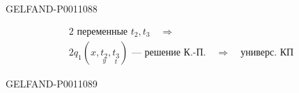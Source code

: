 \begin{GelfandAdjacentEvidence}{GELFAND-P001108}{8}


\[
\begin{gathered}
2\text{ переменные }t_2,t_3\quad\Rightarrow\\
2q_1(x,\underset{y}{t_2},\underset{t}{t_3})
\text{ — решение К.-П.}\quad\Rightarrow\quad\text{универс. КП}
\end{gathered}
\]
\end{GelfandAdjacentEvidence}
\begin{GelfandAdjacentEvidence}{GELFAND-P001108}{9}

\end{GelfandAdjacentEvidence}



